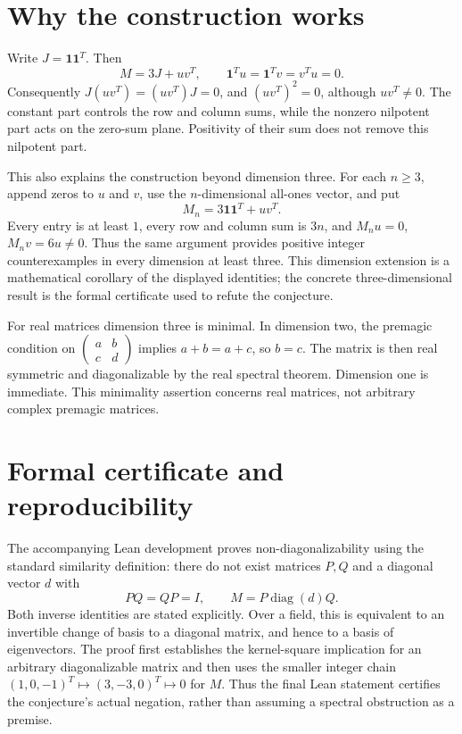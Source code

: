 \documentclass[11pt]{article}
\theoremstyle{remark}\newtheorem{remark}[theorem]{Remark}
\newcommand{\one}{\mathbf 1}
\DeclareMathOperator{\diag}{diag}
\begin{document}
\section{Why the construction works}
Write $J=\one\one^T$. Then
\begin{equation}\label{eq:decomp}
 M=3J+uv^T,
 \qquad \one^Tu=\one^Tv=v^Tu=0.
\end{equation}
Consequently $J(uv^T)=(uv^T)J=0$, and $(uv^T)^2=0$, although
$uv^T\ne0$. The constant part controls the row and column sums, while
the nonzero nilpotent part acts on the zero-sum plane. Positivity of
their sum does not remove this nilpotent part.

This also explains the construction beyond dimension three. For each
$n\geq3$, append zeros to $u$ and $v$, use the $n$-dimensional all-ones
vector, and put
\[
 M_n=3\one\one^T+uv^T.
\]
Every entry is at least $1$, every row and column sum is $3n$, and
$M_nu=0$, $M_nv=6u\ne0$. Thus the same argument provides positive
integer counterexamples in every dimension at least three. This
dimension extension is a mathematical corollary of the displayed
identities; the concrete three-dimensional result is the formal
certificate used to refute the conjecture.

For real matrices dimension three is minimal. In dimension two, the
premagic condition on $\left(\begin{smallmatrix}a&b\\c&d\end{smallmatrix}\right)$
implies $a+b=a+c$, so $b=c$. The matrix is then real symmetric and
diagonalizable by the real spectral theorem. Dimension one is immediate.
This minimality assertion concerns real matrices, not arbitrary complex
premagic matrices.

\section{Formal certificate and reproducibility}\label{sec:formal}
The accompanying Lean development proves non-diagonalizability using
the standard similarity definition: there do not exist matrices $P,Q$
and a diagonal vector $d$ with
\begin{equation}\label{eq:formal}
 PQ=QP=I,\qquad M=P\diag(d)Q.
\end{equation}
Both inverse identities are stated explicitly. Over a field, this is
equivalent to an invertible change of basis to a diagonal matrix, and
hence to a basis of eigenvectors. The proof first establishes the
kernel-square implication for an arbitrary diagonalizable matrix and
then uses the smaller integer chain
$(1,0,-1)^T\mapsto(3,-3,0)^T\mapsto0$ for $M$. Thus the final Lean
statement certifies the conjecture's actual negation, rather than
assuming a spectral obstruction as a premise.
\end{document}
